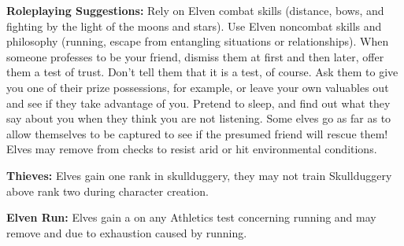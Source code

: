 {\textbf{Roleplaying Suggestions:}
Rely on Elven combat skills (distance, bows, and
fighting by the light of the moons and stars). Use Elven
noncombat skills and philosophy (running, escape from
entangling situations or relationships). When someone
professes to be your friend, dismiss them at first and then
later, offer them a test of trust. Don't tell them that it is a
test, of course. Ask them to give you one of their prize
possessions, for example, or leave your own valuables out
and see if they take advantage of you. Pretend to sleep,
and find out what they say about you when they think
you are not listening. Some elves go as far as to allow
themselves to be captured to see if the presumed friend
will rescue them!
}
{Elves may remove \setback\setback from checks to resist arid or hit environmental conditions.}
{\item \textbf{Thieves: } Elves gain one rank in skullduggery, they may not train Skullduggery above rank two during character creation. }
{\item \textbf{Elven Run: } Elves gain a \boost on any Athletics test concerning running and may remove and \setback due to exhaustion caused by running.}
{}
{}
{}
{}
{}
